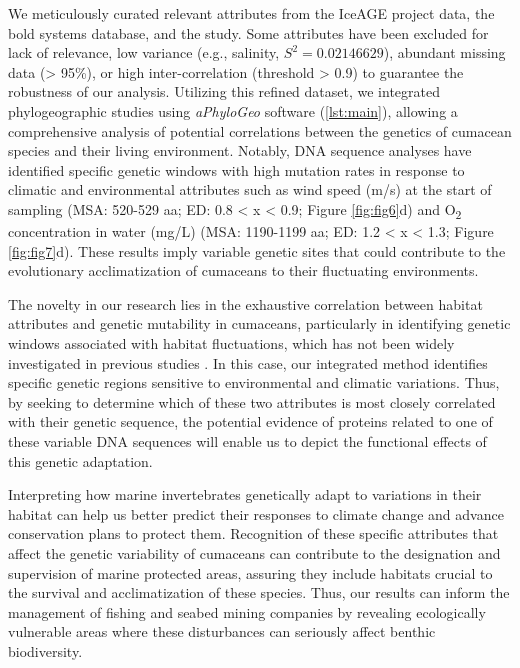 We meticulously curated relevant attributes from the IceAGE project data, the bold systems database, and the \citep{uhlir_adding_2021} study. Some attributes have been excluded for lack of relevance, low variance (e.g., salinity, $S^2 = 0.02146629$), abundant missing data (> 95\%), or high inter-correlation (threshold > 0.9) to guarantee the robustness of our analysis. Utilizing this refined dataset, we integrated phylogeographic studies using \textit{aPhyloGeo} software (\autoref{lst:main}), allowing a comprehensive analysis of potential correlations between the genetics of cumacean species and their living environment. Notably, DNA sequence analyses have identified specific genetic windows with high mutation rates in response to climatic and environmental attributes such as wind speed (m/s) at the start of sampling (MSA: 520-529 aa; ED: 0.8 < x < 0.9; Figure \ref{fig:fig6}d) and O\textsubscript{2} concentration in water (mg/L) (MSA: 1190-1199 aa; ED: 1.2 < x < 1.3; Figure \ref{fig:fig7}d). These results imply variable genetic sites that could contribute to the evolutionary acclimatization of cumaceans to their fluctuating environments.

The novelty in our research lies in the exhaustive correlation between habitat attributes and genetic mutability in cumaceans, particularly in identifying genetic windows associated with habitat fluctuations, which has not been widely investigated in previous studies \citep{manel2003landscape, vrijenhoek2009cryptic}. In this case, our integrated method identifies specific genetic regions sensitive to environmental and climatic variations. Thus, by seeking to determine which of these two attributes is most closely correlated with their genetic sequence, the potential evidence of proteins related to one of these variable DNA sequences will enable us to depict the functional effects of this genetic adaptation.

Interpreting how marine invertebrates genetically adapt to variations in their habitat can help us better predict their responses to climate change and advance conservation plans to protect them. Recognition of these specific attributes that affect the genetic variability of cumaceans can contribute to the designation and supervision of marine protected areas, assuring they include habitats crucial to the survival and acclimatization of these species. Thus, our results can inform the management of fishing and seabed mining companies by revealing ecologically vulnerable areas where these disturbances can seriously affect benthic biodiversity.

